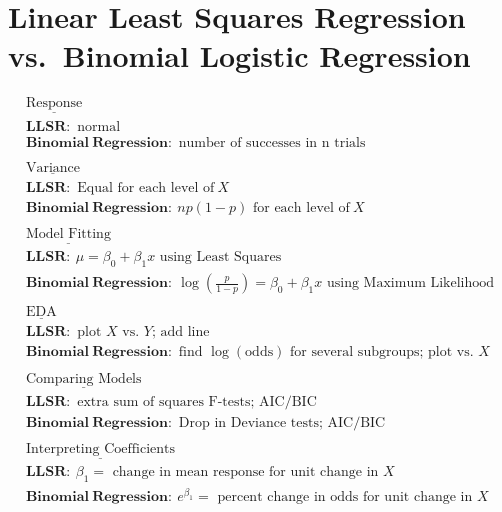 \documentclass[
]{krantz}
\begin{document}
\hypertarget{linear-least-squares-regression-vs.-binomial-logistic-regression}{%
\section{\texorpdfstring{Linear Least Squares Regression  vs.~Binomial Logistic Regression }{Linear Least Squares Regression  vs.~Binomial Logistic Regression }}\label{linear-least-squares-regression-vs.-binomial-logistic-regression}}

\begin{gather*}
\underline{\textrm{Response}} \\
\mathbf{LLSR:}\textrm{ normal} \\
\mathbf{Binomial\ Regression:}\textrm{ number of successes in n trials} \\
\textrm{ } \\
\underline{\textrm{Variance}} \\
\mathbf{LLSR:}\textrm{ Equal for each level of}\ X \\
\mathbf{Binomial\ Regression:}\ np(1-p)\textrm{ for each level of}\ X \\
\textrm{ } \\
\underline{\textrm{Model Fitting}} \\
\mathbf{LLSR:}\ \mu=\beta_0+\beta_1x \textrm{ using Least Squares}\\
\mathbf{Binomial\ Regression:}\ \log\left(\frac{p}{1-p}\right)=\beta_0+\beta_1x \textrm{ using Maximum Likelihood}\\
\textrm{ } \\
\underline{\textrm{EDA}} \\
\mathbf{LLSR:}\textrm{ plot $X$ vs. $Y$; add line} \\
\mathbf{Binomial\ Regression:}\textrm{ find $\log(\textrm{odds})$ for several subgroups; plot vs. $X$} \\
\textrm{ } \\
\underline{\textrm{Comparing Models}} \\
\mathbf{LLSR:}\textrm{ extra sum of squares F-tests; AIC/BIC} \\
\mathbf{Binomial\ Regression:}\textrm{ Drop in Deviance tests; AIC/BIC} \\
\textrm{ } \\
\underline{\textrm{Interpreting Coefficients}} \\
\mathbf{LLSR:}\ \beta_1=\textrm{ change in mean response for unit change in $X$} \\
\mathbf{Binomial\ Regression:}\ e^{\beta_1}=\textrm{ percent change in odds for unit change in $X$} 
\end{gather*}
\end{document}
